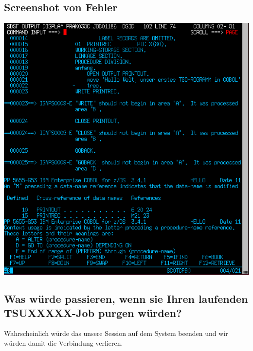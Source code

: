 \documentclass[a4paper]{scrartcl}
\begin{document}
	\subsection{Screenshot von Fehler}
	\includegraphics{screenshots/3_sdsf_error.png}
	
	\subsection{Was würde passieren, wenn sie Ihren laufenden TSUXXXXX-Job purgen würden?}
	
	Wahrscheinlich würde das unsere Session auf dem System beenden und wir würden damit die Verbindung verlieren.
\end{document}
